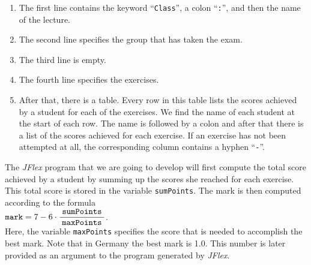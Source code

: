 
\begin{enumerate}
\item The first line contains the keyword ``\texttt{Class}'', a colon ``\texttt{:}'', and then the
      name of the lecture. 
\item The second line specifies the group that has taken the exam.
\item The third line is empty.
\item The fourth line specifies the exercises.
\item After that, there is a table.  Every row in this table lists the scores achieved by a student
      for each of the exercises.  We find the name of each student at the start of each row.  The
      name is followed by a colon and after that there is a list of the scores achieved for each
      exercise.  If an exercise has not been attempted at all, the corresponding column contains a hyphen
      ``\texttt{-}''.
\end{enumerate}
The \textsl{JFlex} program that we are going to develop will first compute the total score achieved
by a student by summing up the scores she reached for each exercise.  This total score is stored in
the variable \texttt{sumPoints}.  The mark is then computed according to the formula
\\[0.2cm]
\hspace*{1.3cm}
$\displaystyle\texttt{mark} = 7 - 6 \cdot \frac{\;\texttt{sumPoints}\;}{\texttt{maxPoints}}$.
\\[0.2cm]
Here, the  variable \texttt{maxPoints} specifies the score that is needed to accomplish the best
mark. Note that in  Germany the best mark is 1.0.  This number is later provided as an argument to the
program generated by \textsl{JFlex}.


